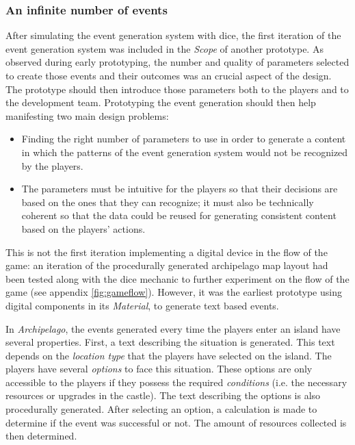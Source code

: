 \subsubsection{An infinite number of events}
After simulating the event generation system with dice, the first iteration of the event generation system was included in the \textit{Scope} of another prototype. As observed during early prototyping, the number and quality of parameters selected to create those events and their outcomes was an crucial aspect of the design. The prototype should then introduce those parameters both to the players and to the development team. Prototyping the event generation should then help manifesting two main design problems:
\begin{itemize}
\item Finding the right number of parameters to use in order to generate a content in which the patterns of the event generation system would not be recognized by the players.
\item The parameters must be intuitive for the players so that their decisions are based on the ones that they can recognize; it must also be technically coherent so that the data could be reused for generating consistent content based on the players' actions.
\end{itemize}
This is not the first iteration implementing a digital device in the flow of the game: an iteration of the procedurally generated archipelago map layout had been tested along with the dice mechanic to further experiment on the flow of the game (see appendix \ref{fig:gameflow}). However, it was the earliest prototype using digital components in its \textit{Material}, to generate text based events.

In \textit{Archipelago}, the events generated every time the players enter an island have several properties. First, a text describing the situation is generated. This text depends on the \textit{location type} that the players have selected on the island. The players have several \textit{options} to face this situation. These options are only accessible to the players if they possess the required \textit{conditions} (i.e. the necessary resources or upgrades in the castle). The text describing the options is also procedurally generated. After selecting an option, a calculation is made to determine if the event was successful or not. The amount of resources collected is then determined. 
